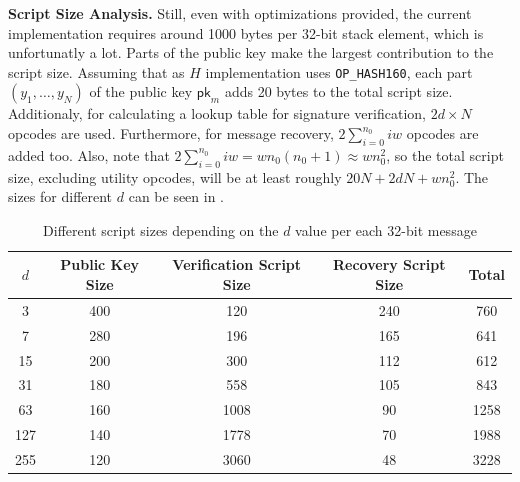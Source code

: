 \documentclass{iacrtrans}
\begin{document}
\textbf{Script Size Analysis.} Still, even with optimizations provided, the
current implementation requires around 1000 bytes per 32-bit stack element,
which is unfortunatly a lot. Parts of the public key make the largest
contribution to the script size. Assuming that as $H$ implementation uses
\texttt{OP\_HASH160}, each part $(y_1,\dots,y_N)$ of the public key
$\mathsf{pk}_{m}$ adds 20 bytes to the total script size. Additionaly, for
calculating a lookup table for signature verification, $2d \times N$ opcodes are
used. Furthermore, for message recovery, $2\sum_{i = 0}^{n_0} i w$ opcodes are
added too. Also, note that $2 \sum_{i = 0}^{n_0} i w = w n_0 (n_0+1) \approx w
n_0^2$, so the total script size, excluding utility opcodes, will be at least
roughly $20N + 2 dN + w n_0^2$. The sizes for different $d$ can be seen in
.

\begin{table}[H]
  \centering
  \begin{tabular}{ccccc}
    \toprule
    $d$ & \textbf{Public Key Size} & \textbf{Verification Script Size} & \textbf{Recovery Script Size} & \textbf{Total} \\
    \midrule
    3 & 400 & 120 & 240 & 760 \\
    7 & 280 & 196 & 165 & 641 \\
    15 & 200 & 300 & 112 & 612 \\
    31 & 180 & 558 & 105 & 843 \\
    63 & 160 & 1008 & 90 & 1258 \\
    127 & 140 & 1778 & 70 & 1988 \\
    255 & 120 & 3060 & 48 & 3228 \\
    \bottomrule
  \end{tabular}
  \caption{Different script sizes depending on the $d$
  value per each 32-bit message}\label{tab:winternitz-script-size}
\end{table}
\end{document}
